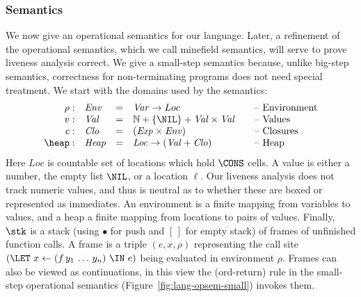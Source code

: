 \subsubsection{Semantics}
We now give an operational
semantics for  our language.  Later, a refinement of
the  operational semantics,  which we  call minefield  semantics, will
serve to prove liveness analysis correct.
We give a small-step semantics because, unlike big-step semantics,
correctness for non-terminating programs does not need special treatment.
We start with the domains used by the semantics:
\[
\begin{array}{rlcl@{\hspace{2em}}l}
\rho: & \mathit{Env} &=&\mathit{Var} \rightarrow {Loc} & \mbox{-- Environment} \\ 
v:   & \mathit{Val} &=& \mathbb{N} + \{\NIL\} + \mathit{Val \times
  Val}& \mbox{-- Values}\\
c:   & \mathit{Clo} &=& \mathit{(Exp \times Env)}& \mbox{-- Closures}\\
\heap: & \mathit{Heap} & =&\mathit{Loc} \rightarrow (\mathit{Val} +
\mathit{Clo}) & \mbox{-- Heap}
\end{array}
\]
Here $\mathit{Loc}$ is countable set of locations which hold $\CONS$ cells.
A value is either a number, the empty list $\NIL$, or a location  $\ell$.
Our liveness analysis does not track numeric values, and thus is neutral
as to whether these are boxed or represented as immediates.
An environment is a finite mapping from variables to values, and a heap a finite mapping
from locations to pairs of values.
Finally, $\stk$ is a stack
(using $\bullet$ for push and $[\,]$ for empty stack)
of frames of unfinished function calls.  A
frame is a triple $(e,x,\rho)$ representing the call site
$
(\LET\,\, x \leftarrow (f\,y_1\,\ldots\,y_n) \,\, \IN\,\, e)
$
being evaluated in environment $\rho$.
Frames can also be viewed as continuations, in this view
the ({\sc ord-return}) 
 rule in the small-step operational semantics (Figure~\ref{fig:lang-opsem-small}) invokes them.

